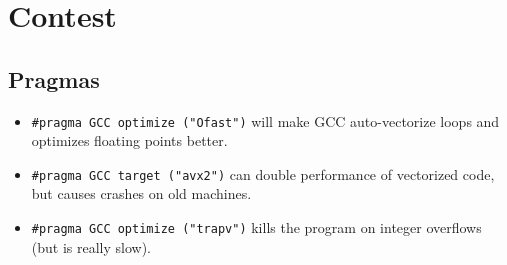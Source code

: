 \chapter{Contest}


\section{Pragmas}
	\begin{itemize}
		\item \lstinline{#pragma GCC optimize ("Ofast")} will make GCC auto-vectorize loops and optimizes floating points better.
		\item \lstinline{#pragma GCC target ("avx2")} can double performance of vectorized code, but causes crashes on old machines.
		\item \lstinline{#pragma GCC optimize ("trapv")} kills the program on integer overflows (but is really slow).
	\end{itemize}